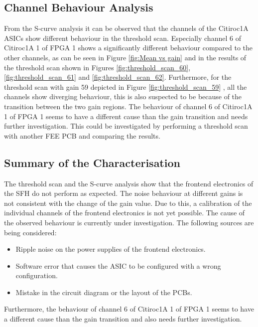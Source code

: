     \subsection{Channel Behaviour Analysis}
    From the S-curve analysis it can be observed that the channels of the Citiroc1A ASICs show different behaviour in the threshold scan.
    \newline
    Especially channel 6 of Citiroc1A 1 of FPGA 1 shows a significantly different behaviour compared to the other channels,
    as can be seen in Figure \ref{fig:Mean vs gain} and in the results of the threshold scan shown in Figures \ref{fig:threshold_scan_60}, \ref{fig:threshold_scan_61} and \ref{fig:threshold_scan_62}.
    \newline
    Furthermore, for the threshold scan with gain 59 depicted in Figure \ref{fig:threshold_scan_59} , all the channels show diverging behaviour, this is also suspected to be because of the transition between the two gain regions.
    \newline
    The behaviour of channel 6 of Citiroc1A 1 of FPGA 1 seems to have a different cause than the gain transition and needs further investigation.
    This could be investigated by performing a threshold scan with another FEE PCB and comparing the results.
    \subsection{Summary of the Characterisation}
    The threshold scan and the S-curve analysis show that the frontend electronics of the SFH do not perform as expected.
    The noise behaviour at different gains is not consistent with the change of the gain value.
    \newline
    Due to this, a calibration of the individual channels of the frontend electronics is not yet possible.
    The cause of the observed behaviour is currently under investigation. The following sources are being considered:
    \begin{itemize}
        \item Ripple noise on the power supplies of the frontend electronics.
        \item Software error that causes the ASIC to be configured with a wrong configuration.
        \item Mistake in the circuit diagram or the layout of the PCBs. 
    \end{itemize}
    Furthermore, the behaviour of channel 6 of Citiroc1A 1 of FPGA 1 seems to have a different cause than the gain transition and also needs further investigation.
    
    

     
